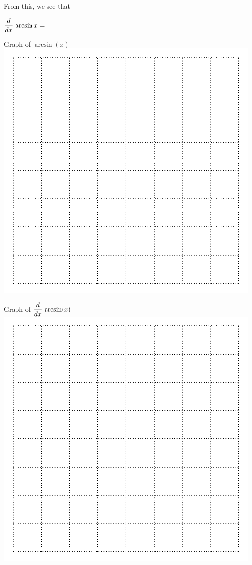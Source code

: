 \newpage
\begin{minipage}[t]{0.45\linewidth}
  \vspace{0pt} From this, we see that

 \begin{center}
  $\displaystyle \frac{d}{dx} \, \arcsin x =$ \hspace{2in}~
 \end{center}
\end{minipage}
\hfill
\begin{minipage}[t]{0.45\linewidth}
\vspace{0pt}
\begin{center}
Graph of $\arcsin(x)$ \\
\includegraphics[width=0.7\linewidth]{graphics/empty_graph_square_8}

Graph of $\displaystyle \frac{d}{dx} \, \arcsin(x)$ \\
\includegraphics[width=0.7\linewidth]{graphics/empty_graph_square_8}
\end{center}
\end{minipage}

